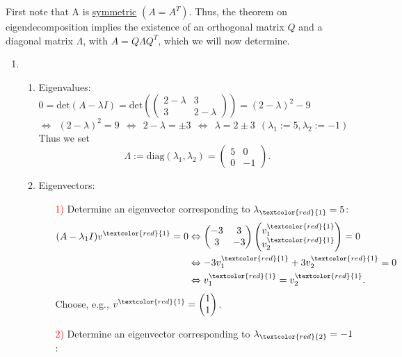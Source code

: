 {\color{solution}
First note that A is \underline{symmetric} $(A=A^T)$. Thus, the theorem on eigendecomposition implies the existence of an orthogonal matrix $Q$ and a diagonal matrix $\Lambda$, with $A=Q\Lambda Q^T$, which we will now determine.
\begin{enumerate}
	\item \begin{enumerate}
	\item Eigenvalues:\\
	\hspace*{0.6cm}$0= \text{det}(A-\lambda I) = \text{det}\left(\begin{pmatrix}2-\lambda&3\\3&2-\lambda\end{pmatrix}\right) = (2-\lambda)^2-9$\\
	$\Leftrightarrow~~(2-\lambda)^2 = 9~~ \Leftrightarrow~~2-\lambda = \pm 3~~ \Leftrightarrow~~\lambda = 2\pm 3~~ (\lambda_1:=5, \lambda_2:=-1)$\\
	Thus we set $$\Lambda:=\text{diag}(\lambda_1,\lambda_2)=\begin{pmatrix}5&0\\0&-1\end{pmatrix}.$$
	\item Eigenvectors:
	\begin{enumerate}
		\item[\textcolor{red}{1)}] 
		Determine an eigenvector corresponding to $\lambda_{\textcolor{red}{1}}=5$:
		\begin{align*}
		(A-\lambda_1 I)v^{\textcolor{red}{1}}=0 &\Leftrightarrow \begin{pmatrix}-3&3\\3&-3\end{pmatrix}\begin{pmatrix}v_1^{\textcolor{red}{1}}\\v_2^{\textcolor{red}{1}}\end{pmatrix}=0\\
		&\Leftrightarrow -3v_1^{\textcolor{red}{1}}+3v_2^{\textcolor{red}{1}} =0\\
		&\Leftrightarrow v_1^{\textcolor{red}{1}} = v_2^{\textcolor{red}{1}}.
		\end{align*}
		Choose, e.g., $v^{\textcolor{red}{1}} = \begin{pmatrix}1\\1\end{pmatrix}$.
		\item[\textcolor{red}{2)}] 
		Determine an eigenvector corresponding to $\lambda_{\textcolor{red}{2}}=-1$:

\end{enumerate}
\end{enumerate}
\end{enumerate}}
